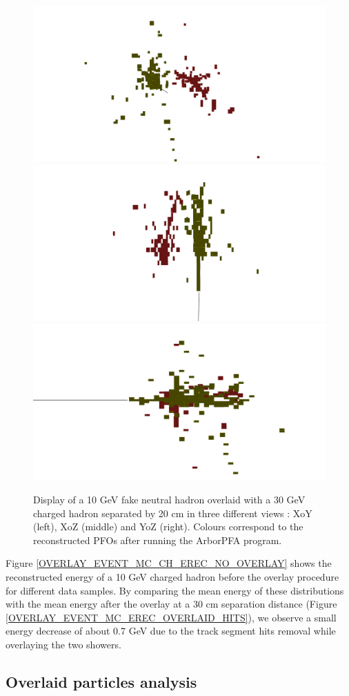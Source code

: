 \documentclass[cits]{JINST}
\begin{document}
\begin{figure}[!h]
  \begin{center}
    \includegraphics[width=0.28\linewidth]{ArborPFA_PandoraMonitoring_SDHCAL_Overlay_XY.pdf}
    \includegraphics[width=0.28\linewidth]{ArborPFA_PandoraMonitoring_SDHCAL_Overlay_XZ.pdf}
    \includegraphics[width=0.28\linewidth]{ArborPFA_PandoraMonitoring_SDHCAL_Overlay_YZ.pdf}
  \end{center}
  \caption{\label{OVERLAY_EVENT_DISPLAY} 
  Display of a 10 GeV fake neutral hadron overlaid with a 30 GeV charged hadron separated by 20 cm in three different views : XoY (left), XoZ (middle) and YoZ (right). Colours correspond to the reconstructed PFOs after running the ArborPFA program. %
  }
\end{figure}

Figure \ref{OVERLAY_EVENT_MC_CH_EREC_NO_OVERLAY} shows the reconstructed energy of a 10 GeV charged hadron before the overlay procedure for different data samples. By comparing the mean energy of these distributions with the mean energy after the overlay at a 30 cm separation distance (Figure \ref{OVERLAY_EVENT_MC_EREC_OVERLAID_HITS}), we observe a small energy decrease of about 0.7 GeV due to the track segment hits removal while overlaying the two showers.


\subsection{Overlaid particles analysis}
\end{document}
